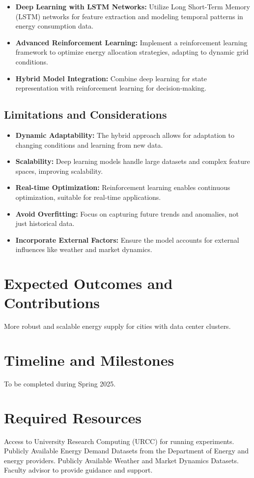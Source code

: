 \documentclass[12pt]{article}
\begin{document}
\begin{itemize}
    \item \textbf{Deep Learning with LSTM Networks:} Utilize Long Short-Term Memory (LSTM) networks for feature extraction and modeling temporal patterns in energy consumption data.
    \item \textbf{Advanced Reinforcement Learning:} Implement a reinforcement learning framework to optimize energy allocation strategies, adapting to dynamic grid conditions.
    \item \textbf{Hybrid Model Integration:} Combine deep learning for state representation with reinforcement learning for decision-making.
\end{itemize}

\subsection{Limitations and Considerations}
\begin{itemize}
    \item \textbf{Dynamic Adaptability:} The hybrid approach allows for adaptation to changing conditions and learning from new data.
    \item \textbf{Scalability:} Deep learning models handle large datasets and complex feature spaces, improving scalability.
    \item \textbf{Real-time Optimization:} Reinforcement learning enables continuous optimization, suitable for real-time applications.
    \item \textbf{Avoid Overfitting:} Focus on capturing future trends and anomalies, not just historical data.
    \item \textbf{Incorporate External Factors:} Ensure the model accounts for external influences like weather and market dynamics.
\end{itemize}

\section{Expected Outcomes and Contributions}
More robust and scalable energy supply for cities with data center clusters.

\section{Timeline and Milestones}
To be completed during Spring 2025.

\section{Required Resources}
Access to University Research Computing (URCC) for running experiments.
Publicly Available Energy Demand Datasets from the Department of Energy and energy providers.
Publicly Available Weather and Market Dynamics Datasets.
Faculty advisor to provide guidance and support.
\end{document}
